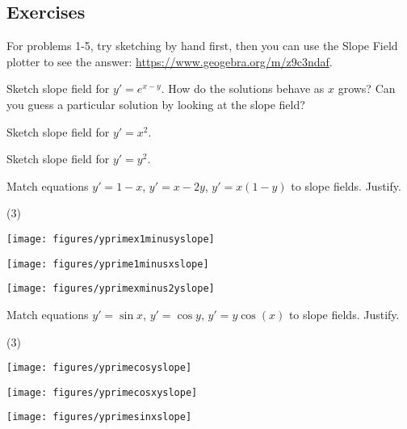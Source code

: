 \subsection{Exercises}

For problems 1-5, try sketching by hand first, then you can use the Slope Field plotter to see the answer: \href{https://www.geogebra.org/m/z9c3ndaf}{https://www.geogebra.org/m/z9c3ndaf}.

\begin{exercise}
Sketch slope field for $y'=e^{x-y}$.  How do the solutions behave as $x$
grows?  Can you guess a particular solution by looking at the slope
field?
\end{exercise}

\begin{exercise}
Sketch slope field for $y'=x^2$.
\end{exercise}

\begin{exercise}
Sketch slope field for $y'=y^2$.
\end{exercise}

\begin{samepage}
\begin{exercise}
Match equations $y'=1-x$, $y'=x-2y$, $y' = x(1-y)$ to slope fields.
Justify.
\begin{tasks}(3)
\task
\parbox[c]{1.75in}{\texttt{[image: figures/yprimex1minusyslope]}}
\task
\parbox[c]{1.75in}{\texttt{[image: figures/yprime1minusxslope]}}
\task
\parbox[c]{1.75in}{\texttt{[image: figures/yprimexminus2yslope]}}
\end{tasks}
\end{exercise}
\end{samepage}

\begin{samepage}
    \begin{exercise}
    Match equations $y'=\sin x$, $y'=\cos y$, $y' = y\cos(x)$ to slope fields.
    Justify.
    \begin{tasks}(3)
    \task
    \parbox[c]{1.75in}{\texttt{[image: figures/yprimecosyslope]}}
    \task
    \parbox[c]{1.75in}{\texttt{[image: figures/yprimecosxyslope]}}
    \task
    \parbox[c]{1.75in}{\texttt{[image: figures/yprimesinxslope]}}
    \end{tasks}
    \end{exercise}
    \end{samepage}

